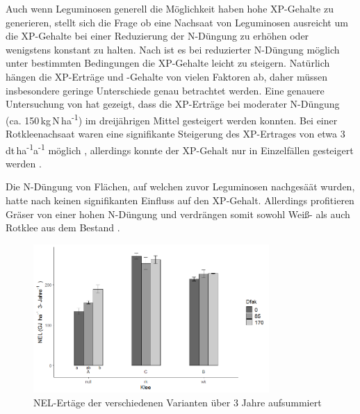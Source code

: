 Auch wenn Leguminosen generell die Möglichkeit haben hohe \ac{XP}-Gehalte \parencite[141]{Taube1998} zu generieren, stellt sich die Frage ob eine Nachsaat von Leguminosen ausreicht um die \ac{XP}-Gehalte bei einer Reduzierung der N-Düngung zu erhöhen oder wenigstens konstant zu halten.
Nach \textcite[11]{engel2013protein} ist es bei reduzierter N-Düngung möglich unter bestimmten Bedingungen die \ac{XP}-Gehalte leicht zu steigern.
Natürlich hängen die \ac{XP}-Erträge und -Gehalte von vielen Faktoren ab, daher müssen insbesondere geringe Unterschiede genau betrachtet werden.
Eine genauere Untersuchung von \textcite{weggler2020langzeitbeobachtungen} hat gezeigt, dass die \ac{XP}-Erträge bei moderater N-Düngung (ca. 150\,kg\,N\,ha\textsuperscript{-1}) im dreijährigen Mittel gesteigert werden konnten.
Bei einer Rotkleenachsaat waren eine signifikante Steigerung des \ac{XP}-Ertrages von etwa 3\,dt\,ha\textsuperscript{-1}a\textsuperscript{-1} möglich \parencite[12]{weggler2020langzeitbeobachtungen}, allerdings konnte der \ac{XP}-Gehalt nur in Einzelfällen gesteigert werden \parencite[13]{weggler2020langzeitbeobachtungen}.


Die N-Düngung von Flächen, auf welchen zuvor Leguminosen nachgesäät wurden, hatte nach \textcite[34]{weggler2050leguminosen} keinen signifikanten Einfluss auf den \ac{XP}-Gehalt.
Allerdings profitieren Gräser von einer hohen N-Düngung und verdrängen somit sowohl Weiß- als auch Rotklee aus dem Bestand \parencite[161]{black2009clover}.


\begin{figure}
	\centering
	\includegraphics[width=0.8\textwidth]{images/wegglerAbb2}
	\caption[\ac{NEL}-Erträge der verschiedenen Varianten über 3 Jahre aufsummiert]{\ac{NEL}-Ertäge der verschiedenen Varianten über 3 Jahre aufsummiert \parencite[36]{weggler2050leguminosen}}
	\label{fig:wegglerAbb2}
\end{figure}


